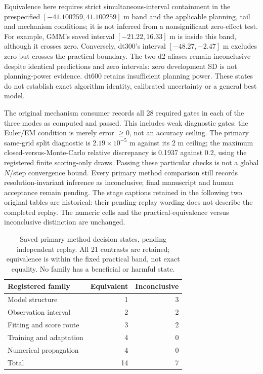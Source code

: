 \documentclass[11pt]{article}
\begin{document}
Equivalence here requires strict simultaneous-interval containment in the
prespecified $[-41.100259,41.100259]$ m band and the applicable planning,
tail and mechanism conditions; it is not inferred from a nonsignificant
zero-effect test. For example, GMM's saved interval $[-21.22,16.33]$ m is
inside this band, although it crosses zero. Conversely, dt300's interval
$[-48.27,-2.47]$ m excludes zero but crosses the practical boundary.
The two d2 aliases remain inconclusive despite identical predictions and
zero intervals: zero development SD is not planning-power evidence.
dt600 retains insufficient planning power. These states do not establish
exact algorithm identity, calibrated uncertainty or a general best model.

The original mechanism consumer records all 28 required gates in each of
the three modes as computed and passed. This includes weak diagnostic gates:
the Euler/EM condition is merely error $\geq0$, not an accuracy ceiling.
The primary same-grid split diagnostic is $2.19\times10^{-5}$ m against its
2 m ceiling; the maximum closed-versus-Monte-Carlo relative discrepancy is
0.1937 against 0.2, using the registered finite scoring-only draws.
Passing these particular checks is not a global $N$/step convergence bound.
Every primary method comparison still records resolution-invariant inference
as inconclusive; final manuscript and human acceptance remain pending.
The stage captions retained in the following two original tables are historical:
their pending-replay wording does not describe the completed replay. The numeric
cells and the practical-equivalence versus inconclusive distinction are unchanged.

\begin{table}[htbp]
\centering\small
\caption{Saved primary method decision states, pending independent replay.
All 21 contrasts are retained; equivalence is within the fixed practical
band, not exact equality. No family has a beneficial or harmful state.}
\label{tab:saved-analysis-states}
\begin{tabular}{@{}lrr@{}}
\toprule
Registered family & Equivalent & Inconclusive\\
\midrule
Model structure & 1 & 3\\
Observation interval & 2 & 2\\
Fitting and score route & 3 & 2\\
Training and adaptation & 4 & 0\\
Numerical propagation & 4 & 0\\
Total & 14 & 7\\
\bottomrule
\end{tabular}
\end{table}
\end{document}
